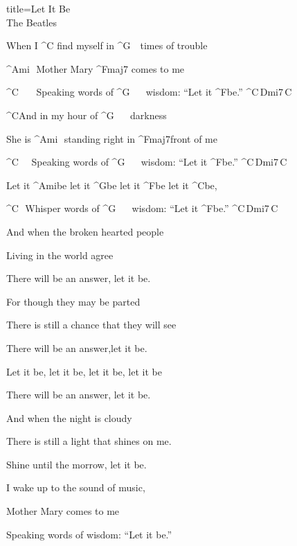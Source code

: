 \begin{song}{title=\predtitle\centering Let It Be \\\large The Beatles  \vspace*{-0.3cm}}  %
\begin{centerjustified}

\sloka 
	When I ^{C\,\,}find myself in ^{G\,\,\,\,\,\,}times of trouble

	^{Ami\,\,\,\,}Mother Mary ^{Fmaj7\,\,}comes to me
	
	^{C\,\,\,\,\,\,\,\,\,\,\,}Speaking words of ^{G\,\,\,\,\,\,\,\,\,\,}wisdom: ``Let it ^{F}be.'' ^{C\,Dmi7\,C}
	
	^{C}And in my hour of ^{G\,\,\,\,\,\,\,\,\,\,}darkness

	She is ^{Ami\,\,\,\,}standing right in ^{Fmaj7}front of me

	^{C\,\,\,\,\,\,\,\,}Speaking words of ^{G\,\,\,\,\,\,\,\,\,\,}wisdom: ``Let it ^{F}be.'' ^{C\,Dmi7\,C}

	Let it ^{Ami}be let it ^{G}be let it ^{F}be let it ^{C}be,

	^{C\,\,\,\,}Whisper words of ^{G\,\,\,\,\,\,\,\,\,\,}wisdom: ``Let it ^{F}be.'' ^{C\,Dmi7\,C}

\sloka
	And when the broken hearted people
   	
   	Living in the world agree
	
	There will be an answer, let it be.
   	
   	For though they may be parted
   	
   	There is still a chance that they will see
  	
  	There will be an answer,let it be.

	Let it be, let it be, let it be, let it be
    
    There will be an answer, let it be.



\sloka
	And when the night is cloudy
   	
   	There is still a light that shines on me.
	
	Shine until the morrow, let it be.
   	
   	I wake up to the sound of music,
   	
   	Mother Mary comes to me
   	
   	Speaking words of wisdom: ``Let it be.''




\end{centerjustified}
\setcounter{Slokočet}{0}
\end{song}
